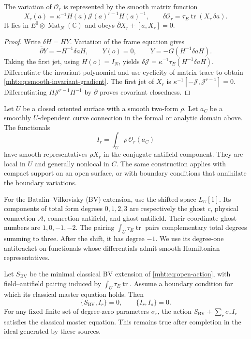 \begin{proposition}\label{mht:prop:smooth-invariant-gradient}
The variation of $\mathcal O_r$ is represented by the smooth matrix
function
\begin{equation}\label{mht:eq:smooth-invariant-gradient}
 X_r(a)=\kappa^{-1}H(a)\mathcal J(a)^{r-1}H(a)^{-1},\qquad
 \delta\mathcal O_r=\tau_E\operatorname{tr}(X_r\,\delta a).
\end{equation}
It lies in $E^0\otimes\operatorname{Mat}_N(\mathbb C)$ and obeys
$\bar\partial X_r+[a,X_r]=0$.
\end{proposition}

\begin{proof}
Write $\delta H=HY$. Variation of the frame equation gives
\[
 \bar\partial Y=-H^{-1}\delta aH,\qquad Y(o)=0,\qquad
 Y=-G(H^{-1}\delta aH).
\]
Taking the first jet, using $H(o)=I_N$, yields
$\delta\mathcal J=\kappa^{-1}\tau_E(H^{-1}\delta aH)$.
Differentiate the invariant polynomial and use cyclicity of matrix
trace to obtain \eqref{mht:eq:smooth-invariant-gradient}.
The first jet of $X_r$ is
$\kappa^{-1}[-\mathcal J,\mathcal J^{r-1}]=0$.
Differentiating $H\mathcal J^{r-1}H^{-1}$ by $\bar\partial$ proves
covariant closedness.
\end{proof}

Let $U$ be a closed oriented surface with a smooth two-form $\rho$.
Let $a_C$ be a smoothly $U$-dependent curve connection in the formal or
analytic domain above. The functionals
\[
 I_r=\int_U\rho\,\mathcal O_r(a_C)
\]
have smooth representatives $\rho X_r$ in the conjugate antifield
component. They are local in $U$ and generally nonlocal in $C$.
The same construction applies with compact support on an open surface,
or with boundary conditions that annihilate the boundary variations.

For the Batalin--Vilkovisky (BV) extension, use the shifted space $L_U[1]$.
Its components of total form degrees $0,1,2,3$ are respectively the
ghost $c$, physical connection $\mathcal A$, connection antifield, and
ghost antifield. Their coordinate ghost numbers are $1,0,-1,-2$.
The pairing $\int_U\tau_E\operatorname{tr}$ pairs complementary total
degrees summing to three. After the shift, it has degree $-1$.
We use its degree-one antibracket on functionals whose differentials
admit smooth Hamiltonian representatives.

\begin{proposition}\label{mht:prop:classical-source-deformation}
Let $S_{\mathrm{BV}}$ be the minimal classical BV extension of
\eqref{mht:eq:open-action}, with field--antifield pairing induced by
$\int_U\tau_E\operatorname{tr}$.
Assume a boundary condition for which its classical master equation
holds. Then
\[
 \{S_{\mathrm{BV}},I_r\}=0,\qquad \{I_r,I_s\}=0.
\]
For any fixed finite set of degree-zero parameters $\sigma_r$, the action
$S_{\mathrm{BV}}+\sum_r\sigma_rI_r$ satisfies the classical master
equation. This remains true after completion in the ideal generated by
these sources.
\end{proposition}

